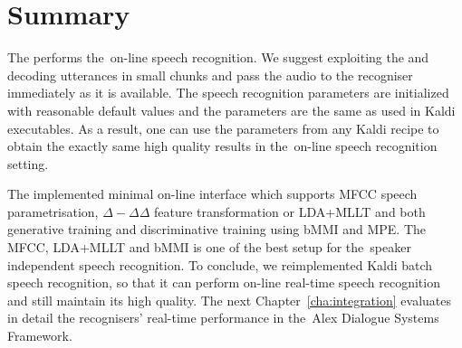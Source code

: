 \section{Summary}
\label{sec:dec_sum}
The  performs the~on-line speech recognition.
We suggest exploiting the  and decoding utterances in small chunks and pass the audio to the recogniser immediately as it is available.
The speech recognition parameters are initialized with reasonable default values and the parameters are the same as used in Kaldi executables. 
As a result, one can use the parameters from any Kaldi recipe to obtain the exactly same high quality results in the~on-line speech recognition setting.

The implemented minimal on-line interface which supports \ac{MFCC} speech parametrisation, $\Delta-\Delta\Delta$ feature transformation or \ac{LDA}+\ac{MLLT} and both generative training and discriminative training using \ac{bMMI} and \ac{MPE}.
The \ac{MFCC}, \ac{LDA}+\ac{MLLT} and \ac{bMMI} is one of the best setup for the~speaker independent speech recognition.
To conclude, we reimplemented Kaldi batch speech recognition, so that it can perform on-line real-time speech recognition and still maintain its high quality.
The next Chapter~\ref{cha:integration} evaluates in detail the recognisers' real-time performance in the~Alex Dialogue Systems Framework.
